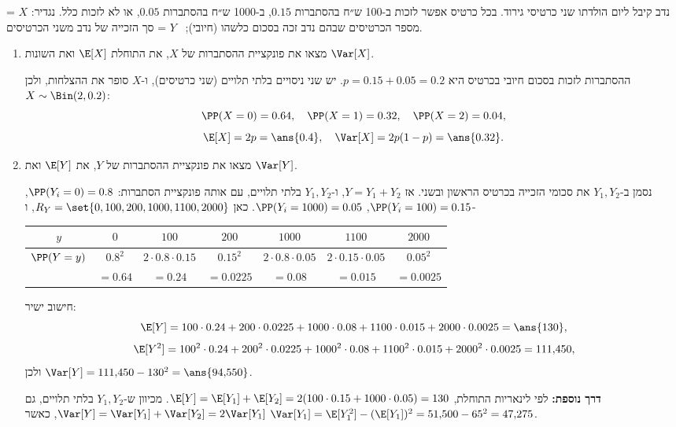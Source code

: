 נדב קיבל ליום הולדתו שני כרטיסי גירוד. בכל כרטיס אפשר לזכות ב-100 ש״ח בהסתברות $0.15$, ב-1000 ש״ח בהסתברות $0.05$, או לא לזכות כלל. נגדיר:
$X$ = מספר הכרטיסים שבהם נדב זכה בסכום כלשהו (חיובי); \ $Y$ = סך הזכייה של נדב משני הכרטיסים.
\begin{enumerate}
\item מצאו את פונקציית ההסתברות של $X$, את התוחלת $\E[X]$ ואת השונות $\Var[X]$.
\begin{solbox}
\unverified
ההסתברות לזכות בסכום חיובי בכרטיס היא $p=0.15+0.05=0.2$. יש שני ניסויים בלתי תלויים (שני כרטיסים), ו-$X$ סופר את ההצלחות, ולכן $X\sim\Bin(2,0.2)$:
\[
\PP(X=0)=0.64,\quad \PP(X=1)=0.32,\quad \PP(X=2)=0.04,
\]
\[
\E[X]=2p=\ans{0.4},\quad \Var[X]=2p(1-p)=\ans{0.32}.
\]
\end{solbox}
\item מצאו את פונקציית ההסתברות של $Y$, את $\E[Y]$ ואת $\Var[Y]$.
\begin{solbox}
\unverified
נסמן ב-$Y_1,Y_2$ את סכומי הזכייה בכרטיס הראשון ובשני. אז $Y=Y_1+Y_2$, ו-$Y_1,Y_2$ בלתי תלויים, עם אותה פונקציית הסתברות:
$\PP(Y_i=0)=0.8$, $\PP(Y_i=100)=0.15$, $\PP(Y_i=1000)=0.05$.
כאן $R_Y=\set{0,100,200,1000,1100,2000}$, ו-
\begin{center}
\renewcommand{\arraystretch}{1.3}
\begin{tabular}{c|cccccc}
$y$ & $0$ & $100$ & $200$ & $1000$ & $1100$ & $2000$\\ \hline
$\PP(Y=y)$ & $0.8^2$ & $2\cdot0.8\cdot0.15$ & $0.15^2$ & $2\cdot0.8\cdot0.05$ & $2\cdot0.15\cdot0.05$ & $0.05^2$\\
& $=0.64$ & $=0.24$ & $=0.0225$ & $=0.08$ & $=0.015$ & $=0.0025$
\end{tabular}
\end{center}
חישוב ישיר:
\[
\E[Y]=100\cdot0.24+200\cdot0.0225+1000\cdot0.08+1100\cdot0.015+2000\cdot0.0025=\ans{130},
\]
\[
\E[Y^2]=100^2\cdot0.24+200^2\cdot0.0225+1000^2\cdot0.08+1100^2\cdot0.015+2000^2\cdot0.0025=111{,}450,
\]
ולכן $\Var[Y]=111{,}450-130^2=\ans{94{,}550}$.

\textbf{דרך נוספת:} לפי לינאריות התוחלת, $\E[Y]=\E[Y_1]+\E[Y_2]=2(100\cdot0.15+1000\cdot0.05)=130$. מכיוון ש-$Y_1,Y_2$ בלתי תלויים, גם $\Var[Y]=\Var[Y_1]+\Var[Y_2]=2\Var[Y_1]$, כאשר
$\Var[Y_1]=\E[Y_1^2]-(\E[Y_1])^2=51{,}500-65^2=47{,}275$.
\end{solbox}
\end{enumerate}
